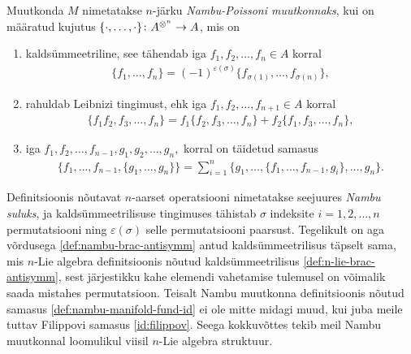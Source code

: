 \begin{dfn}
    Muutkonda $M$ nimetatakse $n$-järku \emph{Nambu-Poissoni muutkonnaks},
    kui on määratud kujutus
    $\{\cdot, \dots, \cdot\} \colon A^{\otimes^n} \to A$, mis on
    \begin{enumerate}
        \item kaldsümmeetriline, see tähendab iga $f_1, f_2, \dots, f_n \in A$
            korral
            \begin{align}\label{def:nambu-brac-antisymm}
                \{f_1, \dots, f_n\} = (-1)^{\varepsilon(\sigma)}
                \{f_{\sigma(1)}, \dots, f_{\sigma(n)}\},
            \end{align}
        \item rahuldab Leibnizi tingimust, ehk iga
            $f_1, f_2, \dots, f_{n+1} \in A$ korral
            \begin{align}
                \{f_1 f_2, f_3, \dots, f_n\} =
                f_1 \{f_2, f_3, \dots, f_n\} +
                f_2 \{f_1, f_3, \dots, f_n\},
            \end{align}
        \item iga $f_1, f_2, \dots, f_{n-1}, g_1, g_2, \dots, g_n,$ korral on
        täidetud samasus
            \begin{align}\label{def:nambu-manifold-fund-id}
                \{f_1, \dots, f_{n-1}, \{g_1, \dots, g_n\}\} =
                \sum_{i=1}^{n} \{
                    g_1, \dots, \{f_1, \dots, f_{n-1}, g_i\}, \dots, g_n
                \}.
            \end{align}
    \end{enumerate}
\end{dfn}

Definitsioonis nõutavat $n$-aarset operatsiooni nimetatakse seejuures
\emph{Nambu suluks}, ja kaldsümmeetrilisuse tingimuses tähistab
$\sigma$ indeksite $i = 1, 2, \dots, n$ permutatsiooni ning
$\varepsilon(\sigma)$ selle permutatsiooni paarsust. Tegelikult on
aga võrdusega \eqref{def:nambu-brac-antisymm} antud kaldsümmeetrilisus
täpselt sama, mis $n$-Lie algebra definitsioonis nõutud kaldsümmeetrilisus
\eqref{def:n-lie-brac-antisymm}, sest järjestikku kahe elemendi vahetamise
tulemusel on võimalik saada mistahes permutatsioon. Teisalt Nambu
muutkonna definitsioonis nõutud samasus \eqref{def:nambu-manifold-fund-id}
ei ole mitte midagi muud, kui juba meile tuttav Filippovi samasus
\eqref{id:filippov}. Seega kokkuvõttes tekib meil Nambu muutkonnal
loomulikul viisil $n$-Lie algebra struktuur.

